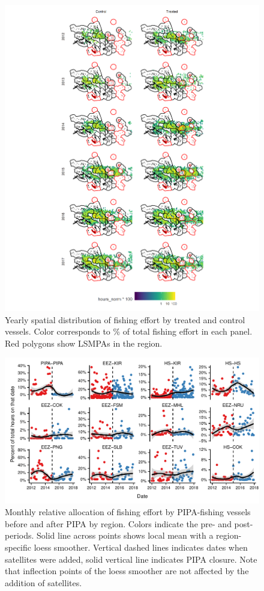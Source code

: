 \documentclass[9pttwoside,lineno]{pnas-new}
\begin{document}
\begin{figure}
\centering
\includegraphics{img/fishing_raster.png}
\caption{\label{fig:fishing_raster}Yearly
spatial distribution of fishing effort by treated and control vessels.
Color corresponds to \% of total fishing effort in each panel.
Red polygons show LSMPAs in the region.}
\end{figure}

\begin{figure}
\centering
\includegraphics{img/redist_trend.pdf}
\caption{\label{fig:redist_trend}Monthly
relative allocation of fishing effort by PIPA-fishing vessels before and
after PIPA by region. Colors indicate the pre- and post- periods. Solid line
across points shows local mean with a region-specific loess smoother.
Vertical dashed lines indicates dates when satellites were added, solid vertical
line indicates PIPA closure. Note that inflection points of
the loess smoother are not affected by the addition of satellites.}
\end{figure}
\end{document}
